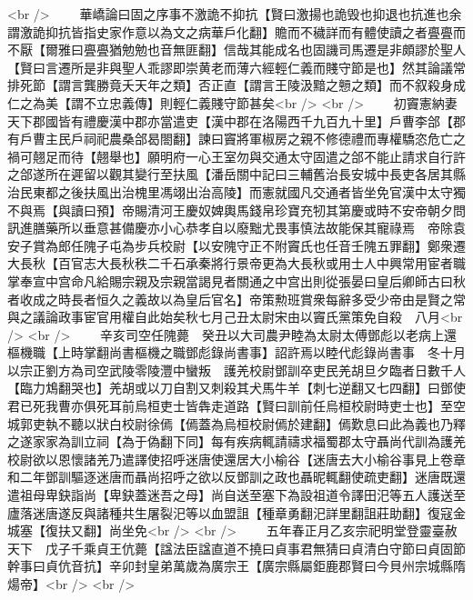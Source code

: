 <br />
　　華嶠論曰固之序事不激詭不抑抗【賢曰激揚也詭毁也抑退也抗進也余謂激詭抑抗皆指史家作意以為文之病華戶化翻】贍而不穢詳而有體使讀之者亹亹而不厭【爾雅曰亹亹猶勉勉也音無匪翻】信哉其能成名也固譏司馬遷是非頗謬於聖人【賢曰言遷所是非與聖人乖謬即崇黄老而薄六經輕仁義而賤守節是也】然其論議常排死節【謂言龔勝竟夭天年之類】否正直【謂言王陵汲黯之戅之類】而不叙殺身成仁之為美【謂不立忠義傳】則輕仁義賤守節甚矣<br />
<br />
　　初竇憲納妻天下郡國皆有禮慶漢中郡亦當遣吏【漢中郡在洛陽西千九百九十里】戶曹李郃【郡有戶曹主民戶祠祀農桑郃曷閤翻】諫曰竇將軍椒房之親不修德禮而專權驕恣危亡之禍可翹足而待【翹舉也】願明府一心王室勿與交通太守固遣之郃不能止請求自行許之郃遂所在遲留以觀其變行至扶風【潘岳關中記曰三輔舊治長安城中長吏各居其縣治民東都之後扶風出治槐里馮翊出治高陵】而憲就國凡交通者皆坐免官漢中太守獨不與焉【與讀曰預】帝賜清河王慶奴婢輿馬錢帛珍寶充牣其第慶或時不安帝朝夕問訊進膳藥所以垂意甚備慶亦小心恭孝自以廢黜尤畏事慎法故能保其寵祿焉　帝除袁安子賞為郎任隗子屯為步兵校尉【以安隗守正不附竇氏也任音壬隗五罪翻】鄭衆遷大長秋【百官志大長秋秩二千石承秦將行景帝更為大長秋或用士人中興常用宦者職掌奉宣中宫命凡給賜宗親及宗親當謁見者關通之中宫出則從張晏曰皇后卿師古曰秋者收成之時長者恒久之義故以為皇后官名】帝策勲班賞衆每辭多受少帝由是賢之常與之議論政事宦官用權自此始矣秋七月己丑太尉宋由以竇氏黨策免自殺　八月<br />
<br />
　　辛亥司空任隗薨　癸丑以大司農尹睦為太尉太傅鄧彪以老病上還樞機職【上時掌翻尚書樞機之職鄧彪錄尚書事】詔許焉以睦代彪錄尚書事　冬十月以宗正劉方為司空武陵零陵灃中蠻叛　護羌校尉鄧訓卒吏民羌胡旦夕臨者日數千人【臨力鴆翻哭也】羌胡或以刀自割又刺殺其犬馬牛羊【刺七逆翻又七四翻】曰鄧使君已死我曹亦俱死耳前烏桓吏士皆犇走道路【賢曰訓前任烏桓校尉時吏士也】至空城郭吏執不聽以狀白校尉徐傿【傿蓋為烏桓校尉傿於建翻】傿歎息曰此為義也乃釋之遂家家為訓立祠【為于偽翻下同】每有疾病輒請禱求福蜀郡太守聶尚代訓為護羌校尉欲以恩懷諸羌乃遣譯使招呼迷唐使還居大小榆谷【迷唐去大小榆谷事見上卷章和二年鄧訓驅逐迷唐而聶尚招呼之欲以反鄧訓之政也聶昵輒翻使疏吏翻】迷唐既還遣祖母卑鈌詣尚【卑鈌蓋迷吾之母】尚自送至塞下為設祖道令譯田汜等五人護送至廬落迷唐遂反與諸種共生屠裂汜等以血盟詛【種章勇翻汜詳里翻詛莊助翻】復寇金城塞【復扶又翻】尚坐免<br />
<br />
　　五年春正月乙亥宗祀明堂登靈臺赦天下　戊子千乘貞王伉薨【諡法臣諡直道不撓曰貞事君無猜曰貞清白守節曰貞固節幹事曰貞伉音抗】辛卯封皇弟萬歲為廣宗王【廣宗縣屬鉅鹿郡賢曰今貝州宗城縣隋煬帝】<br />
<br />
